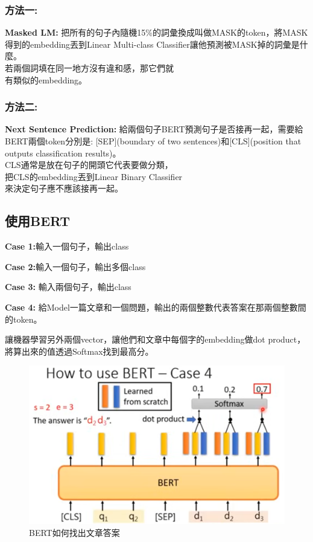 \subsubsection{方法一:}
\textbf{Masked LM:} 把所有的句子內隨機15\%的詞彙換成叫做MASK的token，將MASK得到的embedding丟到Linear Multi-class Classifier讓他預測被MASK掉的詞彙是什麼。\\若兩個詞填在同一地方沒有違和感，那它們就\\有類似的embedding。
\subsubsection{方法二:}
\textbf{Next Sentence Prediction:} 給兩個句子BERT預測句子是否接再一起，需要給BERT兩個token分別是: [SEP](boundary of two sentences)和[CLS](position that outputs classification results)。\\
CLS通常是放在句子的開頭它代表要做分類，\\把CLS的embedding丟到Linear Binary Classifier\\來決定句子應不應該接再一起。

\subsection{使用BERT}
\textbf{Case 1:}輸入一個句子，輸出class \par
\textbf{Case 2:}輸入一個句子，輸出多個class  \par
\textbf{Case 3:} 輸入兩個句子，輸出class\par
\textbf{Case 4:} 給Model一篇文章和一個問題，輸出的兩個整數代表答案在那兩個整數間的token。\par

讓機器學習另外兩個vector，讓他們和文章中每個字的embedding做dot product，將算出來的值透過Softmax找到最高分。
\clearpage
\newpage

\begin{figure}[htbp!]
    \centering
    \includegraphics[width=0.5\linewidth]{images/w6/BERT-case4.png}
    \caption{BERT如何找出文章答案}
    \label{fig:BERT-case4}
\end{figure}

